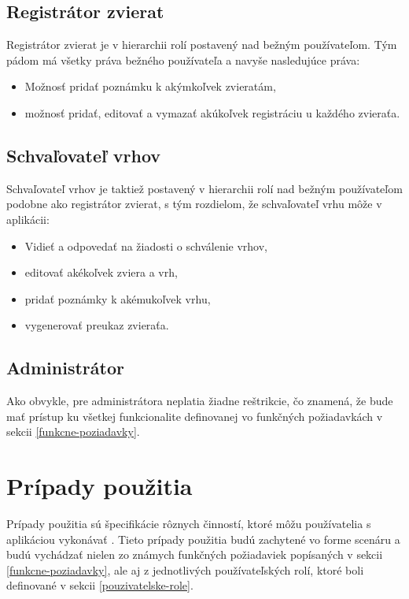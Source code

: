 \subsection{Registrátor zvierat}\label{registrator-zvierat}
Registrátor zvierat je v hierarchii rolí postavený nad bežným používateľom. Tým pádom má všetky práva bežného používateľa a navyše nasledujúce práva:

\begin{itemize}
	\item Možnosť pridať poznámku k akýmkoľvek zvieratám,
	\item možnosť pridať, editovať a vymazať akúkoľvek registráciu u každého zvieraťa.
\end{itemize} 

\subsection{Schvaľovateľ vrhov}\label{schvaľovateľ-vrhov}
Schvaľovateľ vrhov je taktiež postavený v hierarchii rolí nad bežným používateľom podobne ako registrátor zvierat, s tým rozdielom, že schvaľovateľ vrhu môže v aplikácii:

\begin{itemize}
	\item Vidieť a odpovedať na žiadosti o schválenie vrhov,
	\item editovať akékoľvek zviera a vrh,
	\item pridať poznámky k akémukoľvek vrhu,
	\item vygenerovať preukaz zvieraťa.
\end{itemize}

\subsection{Administrátor}\label{administrator}
Ako obvykle, pre administrátora neplatia žiadne reštrikcie, čo znamená, že bude mať prístup ku všetkej funkcionalite definovanej vo funkčných požiadavkách v sekcii \ref{funkcne-poziadavky}.

\pagebreak

\section{Prípady použitia}\label{pripady-pouzitia}
Prípady použitia sú špecifikácie rôznych činností, ktoré môžu používatelia s aplikáciou vykonávať \cite{co-su-pripady-pouzitia}. Tieto prípady použitia budú zachytené vo forme scenáru a budú vychádzať nielen zo známych funkčných požiadaviek popísaných v sekcii \ref{funkcne-poziadavky}, ale aj z jednotlivých používateľských rolí, ktoré boli definované v sekcii \ref{pouzivatelske-role}.

